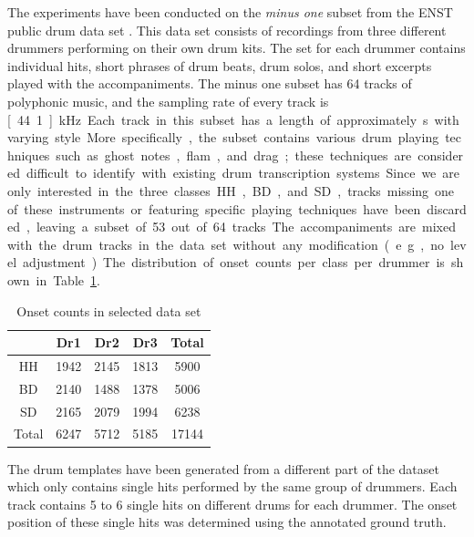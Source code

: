 \documentclass{article}
\newcommand{\tabref}[1]{\mbox{Table~\ref{#1}}}
\begin{document}
The experiments have been conducted on the \textit{minus one} subset from the ENST public drum data set \cite{gillet_enst-drums:_2006}. This data set consists of recordings from three different drummers performing on their own drum kits. The set for each drummer contains individual hits, short phrases of drum beats, drum solos, and short excerpts played with the accompaniments. The minus one subset has 64 tracks of polyphonic music, and the sampling rate of every track is \unit[44.1]{kHz}. Each track in this subset has a length of approximately \unit[70]{s} with varying style. More specifically, the subset contains various drum playing techniques such as ghost notes, flam, and drag; these techniques are considered difficult to identify with existing drum transcription systems. Since we are only interested in the three classes HH, BD, and SD, tracks missing one of these instruments or featuring specific playing techniques have been discarded, leaving a subset of 53 out of 64 tracks.

The accompaniments are mixed with the drum tracks in the data set without any modification (e.g., no level adjustment). The distribution of onset counts per class per drummer is shown in \tabref{tab:onsetCount}. %

\begin{table}[ht]
\begin{footnotesize}
\centering
\begin{tabular}{|c|c|c|c|c|}
\hline
 & Dr1    & Dr2    & Dr3    & Total \\ \hline
HH        & 1942 & 2145 & 1813 & 5900  \\ \hline
BD        & 2140 & 1488 & 1378 & 5006  \\ \hline
SD        & 2165 & 2079 & 1994 & 6238  \\ \hline
Total     & 6247 & 5712 & 5185 & 17144 \\ \hline
\end{tabular}
 \caption{Onset counts in selected data set}%
 \label{tab:onsetCount}
\end{footnotesize}
\end{table}
The drum templates have been generated from a different part of the dataset which only contains single hits performed by the same group of drummers. Each track contains 5 to 6 single hits on different drums for each drummer. The onset position of these single hits was determined using the annotated ground truth. 
\end{document}
